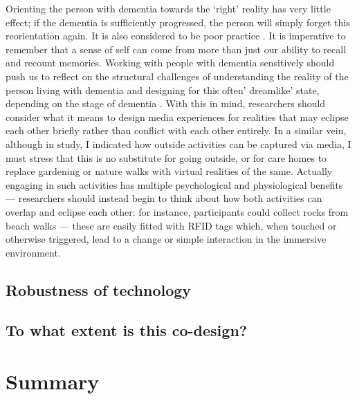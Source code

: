 Orienting the person with dementia towards the `right' reality has very little effect; if the dementia is sufficiently progressed, the person will simply forget this reorientation again. It is also considered to be poor practice \citep{cipriani_understanding_2014}. It is imperative to remember that a sense of self can come from more than just our ability to recall and recount memories. Working with people with dementia sensitively should push us to reflect on the structural challenges of understanding the reality of the person living with dementia and designing for this often' dreamlike' state, depending on the stage of dementia \citep{bryden_before_2015}. With this in mind, researchers should consider what it means to design media experiences for realities that may eclipse each other briefly rather than conflict with each other entirely. In a similar vein,  although in study, I indicated how outside activities can be captured via media, I must stress that this is no substitute for going outside, or for care homes to replace gardening or nature walks with virtual realities of the same. Actually engaging in such activities has multiple psychological and physiological benefits \citep{gilliard_transforming_2011} — researchers should instead begin to think about how both activities can overlap and eclipse each other: for instance, participants could collect rocks from beach walks — these are easily fitted with RFID tags which, when touched or otherwise triggered, lead to a change or simple interaction in the immersive environment.

\subsection{Robustness of technology}
\label{robust-tech}

\subsection{To what extent is this co-design?}
\label{extent-co-design}



\section{Summary}
\label{C4:Summary}






